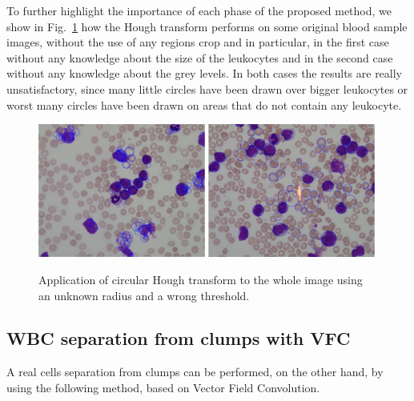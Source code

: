 \documentclass[final,a4paper,12pt,english]{UnicaPhdThesis3}
\begin{document}
{To further highlight the importance of each phase of the proposed method, we show in Fig.~\ref{fig:ex10} how the Hough transform performs on some original blood sample images, without the use of any regions crop and in particular, in the first case without any knowledge about the size of the leukocytes and in the second case without any knowledge about the grey levels. In both cases the results are really unsatisfactory, since many little circles have been drawn over bigger leukocytes or worst many circles have been drawn on areas that do not contain any leukocyte. 
\begin{figure}[!t]
	\centering
	\includegraphics[width=0.49\textwidth]{images/2016_1_mva/wrongradius}
	\includegraphics[width=0.49\textwidth]{images/2016_1_mva/wrongthreshold}
	\caption{\label{fig:ex10}Application of circular Hough transform to the whole image using an unknown radius and a wrong threshold.}
\end{figure}

\subsection{WBC separation from clumps with VFC}
A real cells separation from clumps can be performed, on the other hand, by using the following method, based on Vector Field Convolution.

}
\end{document}
